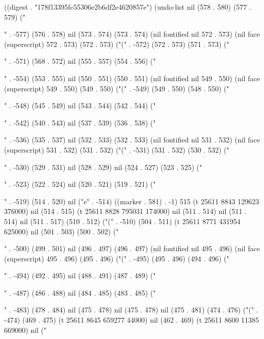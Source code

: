
((digest . "178f13395fc55306e2b6df2e4620857e") (undo-list nil (578 . 580) (577 . 579) ("{" . -577) (576 . 578) nil (573 . 574) (573 . 574) (nil fontified nil 572 . 573) (nil face (superscript) 572 . 573) (572 . 573) ("(" . -572) (572 . 573) (571 . 573) ("{" . -571) (568 . 572) nil (555 . 557) (554 . 556) ("{" . -554) (553 . 555) nil (550 . 551) (550 . 551) (nil fontified nil 549 . 550) (nil face (superscript) 549 . 550) (549 . 550) ("(" . -549) (549 . 550) (548 . 550) ("{" . -548) (545 . 549) nil (543 . 544) (542 . 544) ("{" . -542) (540 . 543) nil (537 . 539) (536 . 538) ("{" . -536) (535 . 537) nil (532 . 533) (532 . 533) (nil fontified nil 531 . 532) (nil face (superscript) 531 . 532) (531 . 532) ("(" . -531) (531 . 532) (530 . 532) ("{" . -530) (529 . 531) nil (528 . 529) nil (524 . 527) (523 . 525) ("{" . -523) (522 . 524) nil (520 . 521) (519 . 521) ("{" . -519) (514 . 520) nil ("e" . -514) ((marker . 581) . -1) 515 (t 25611 8843 129623 376000) nil (514 . 515) (t 25611 8828 795031 174000) nil (511 . 514) nil (511 . 514) nil (511 . 517) (510 . 512) ("(" . -510) (504 . 511) (t 25611 8771 431954 625000) nil (501 . 503) (500 . 502) ("{" . -500) (499 . 501) nil (496 . 497) (496 . 497) (nil fontified nil 495 . 496) (nil face (superscript) 495 . 496) (495 . 496) ("(" . -495) (495 . 496) (494 . 496) ("{" . -494) (492 . 495) nil (488 . 491) (487 . 489) ("{" . -487) (486 . 488) nil (484 . 485) (483 . 485) ("{" . -483) (478 . 484) nil (475 . 478) nil (475 . 478) nil (475 . 481) (474 . 476) ("(" . -474) (469 . 475) (t 25611 8645 659277 44000) nil (462 . 469) (t 25611 8600 11385 669000) nil ("

}}}}}}}}}}}}}
